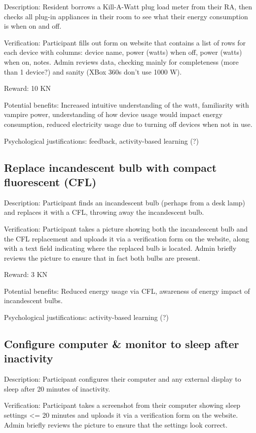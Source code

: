 Description: Resident borrows a Kill-A-Watt plug load meter from their RA, then checks all plug-in appliances in their room to see what their energy consumption is when on and off.

Verification: Participant fills out form on website that contains a list of rows for each device with columns: device name, power (watts) when off, power (watts) when on, notes. Admin reviews data, checking mainly for completeness (more than 1 device?) and sanity (XBox 360s don't use 1000 W).

Reward: 10 KN

Potential benefits: Increased intuitive understanding of the watt, familiarity with vampire power, understanding of how device usage would impact energy consumption, reduced electricity usage due to turning off devices when not in use.

Psychological justifications: feedback, activity-based learning (?)

\subsection{Replace incandescent bulb with compact fluorescent (CFL)}

Description: Participant finds an incandescent bulb (perhaps from a desk lamp) and replaces it with a CFL, throwing away the incandescent bulb.

Verification: Participant takes a picture showing both the incandescent bulb and the CFL replacement and uploads it via a verification form on the website, along with a text field indicating where the replaced bulb is located. Admin briefly reviews the picture to ensure that in fact both bulbs are present.

Reward: 3 KN

Potential benefits: Reduced energy usage via CFL, awareness of energy impact of incandescent bulbs.

Psychological justifications: activity-based learning (?)

\subsection{Configure computer \& monitor to sleep after inactivity}

Description: Participant configures their computer and any external display to sleep after 20 minutes of inactivity.

Verification: Participant takes a screenshot from their computer showing sleep settings <= 20 minutes and uploads it via a verification form on the website. Admin briefly reviews the picture to ensure that the settings look correct.

